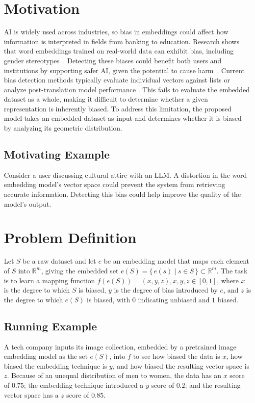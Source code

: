 \documentclass[sigconf]{acmart}
\begin{document}
\section{Motivation}
AI is widely used across industries, so bias in embeddings could affect how information is interpreted in fields from banking to education. Research shows that word embeddings trained on real-world data can exhibit bias, including gender stereotypes~\cite{NIPS2016_a486cd07}. Detecting these biases could benefit both users and institutions by supporting safer AI, given the potential to cause harm~\cite{Schawrtz2022}. Current bias detection methods typically evaluate individual vectors against lists or analyze post-translation model performance \cite{badilla2020wefe}. This fails to evaluate the embedded dataset as a whole, making it difficult to determine whether a given representation is inherently biased. To address this limitation, the proposed model takes an embedded dataset as input and determines whether it is biased by analyzing its geometric distribution.


\subsection{Motivating Example}
Consider a user discussing cultural attire with an LLM. A distortion in the word embedding model’s vector space could prevent the system from retrieving accurate information. Detecting this bias could help improve the quality of the model’s output.


\section{Problem Definition}
Let $S$ be a raw dataset and let $e$ be an embedding model that maps
each element of $S$ into $\mathbb{R}^m$, giving the embedded set
$e(S) = \{\, e(s) \mid s \in S \,\} \subset \mathbb{R}^m$.
The task is to learn a mapping function $f(e(S)) = (x, y, z), x, y, z \in [0, 1]$,
where $x$ is the degree to which $S$ is biased, $y$ is the degree of
bias introduced by $e$, and $z$ is the degree to which $e(S)$ is
biased, with $0$ indicating unbiased and $1$ biased.


\subsection{Running Example}
A tech company inputs its image collection, embedded by a pretrained image embedding model as the set $e(S)$, into $f$ to see how biased the data is $x$, how biased the embedding technique is $y$, and how biased the resulting vector space is $z$. Because of an unequal distribution of men to women, the data has an $x$ score of $0.75$; the embedding technique introduced a $y$ score of $0.2$; and the resulting vector space has a $z$ score of $0.85$.
\end{document}

